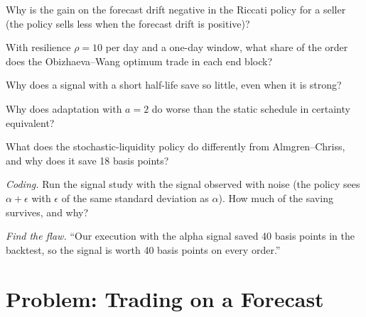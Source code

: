 \begin{exercise}[$\star$]\label{exo:mx:beyond-almgren-chriss:2}
Why is the gain on the forecast drift negative in the Riccati policy for a seller (the policy sells less when the forecast drift is positive)?
\end{exercise}

\begin{exercise}[$\star$]\label{exo:mx:beyond-almgren-chriss:3}
With resilience $\rho=10$ per day and a one-day window, what share of the order does the Obizhaeva--Wang optimum trade in each end block?
\end{exercise}

\begin{exercise}[$\star\star$]\label{exo:mx:beyond-almgren-chriss:4}
Why does a signal with a short half-life save so little, even when it is strong?
\end{exercise}

\begin{exercise}[$\star\star$]\label{exo:mx:beyond-almgren-chriss:5}
Why does adaptation with $a=2$ do worse than the static schedule in certainty equivalent?
\end{exercise}

\begin{exercise}[$\star\star$]\label{exo:mx:beyond-almgren-chriss:6}
What does the stochastic-liquidity policy do differently from Almgren--Chriss, and why does it save 18 basis points?
\end{exercise}

\begin{exercise}[$\star\star\star$]\label{exo:mx:beyond-almgren-chriss:7}
\emph{Coding.} Run the signal study with the signal observed with noise (the policy sees $\alpha+\epsilon$ with $\epsilon$ of the same standard deviation as
$\alpha$). How much of the saving survives, and why?
\end{exercise}

\begin{exercise}[$\star\star\star$]\label{exo:mx:beyond-almgren-chriss:8}
\emph{Find the flaw.} ``Our execution with the alpha signal saved 40 basis points in the backtest, so the signal is worth 40 basis points on every order.''
\end{exercise}

\section{Problem: Trading on a Forecast}

